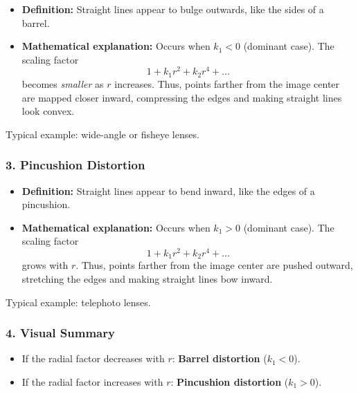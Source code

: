 \documentclass[12pt]{article}
\begin{document}
\begin{itemize}
    \item \textbf{Definition:} Straight lines appear to bulge outwards, like the sides of a barrel.
    \item \textbf{Mathematical explanation:} Occurs when $k_1 < 0$ (dominant case). 
    The scaling factor
    \[
    1 + k_1 r^2 + k_2 r^4 + \dots
    \]
    becomes \emph{smaller} as $r$ increases. 
    Thus, points farther from the image center are mapped closer inward, 
    compressing the edges and making straight lines look convex.
\end{itemize}

Typical example: wide-angle or fisheye lenses.

\subsubsection*{3. Pincushion Distortion}

\begin{itemize}
    \item \textbf{Definition:} Straight lines appear to bend inward, like the edges of a pincushion.
    \item \textbf{Mathematical explanation:} Occurs when $k_1 > 0$ (dominant case).
    The scaling factor
    \[
    1 + k_1 r^2 + k_2 r^4 + \dots
    \]
    grows with $r$. 
    Thus, points farther from the image center are pushed outward, stretching the edges
    and making straight lines bow inward.
\end{itemize}

Typical example: telephoto lenses.

\subsubsection*{4. Visual Summary}

\begin{itemize}
    \item If the radial factor decreases with $r$: \textbf{Barrel distortion} ($k_1 < 0$).
    \item If the radial factor increases with $r$: \textbf{Pincushion distortion} ($k_1 > 0$).
\end{itemize}
\subsection{}
\subsection{}
\subsection{}
\end{document}
